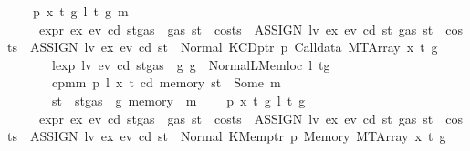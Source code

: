 \begin{isabellebody}
\ \ {\isacharbar}{\kern0pt}\ {\isacharparenleft}{\kern0pt}{}{\isacharparenright}{\kern0pt}\ p\ x\ t\ g\ l\ t{\isacharprime}{\kern0pt}\ g{\isacharprime}{\kern0pt}\ m\isanewline
\ \ \ \ \ {\isachardoublequoteopen}expr\ ex\ ev\ cd\ {\isacharparenleft}{\kern0pt}st{\isasymlparr}gas\ {\isacharcolon}{\kern0pt}{\isacharequal}{\kern0pt}\ gas\ st\ {\isacharminus}{\kern0pt}\ costs\ \ {\isacharparenleft}{\kern0pt}ASSIGN\ lv\ ex{\isacharparenright}{\kern0pt}\ ev\ cd\ st{\isasymrparr}{\isacharparenright}{\kern0pt}\ {\isacharparenleft}{\kern0pt}gas\ st\ {\isacharminus}{\kern0pt}\ costs\ \ {\isacharparenleft}{\kern0pt}ASSIGN\ lv\ ex{\isacharparenright}{\kern0pt}\ ev\ cd\ st{\isacharparenright}{\kern0pt}\ {\isacharequal}{\kern0pt}\ Normal\ {\isacharparenleft}{\kern0pt}{\isacharparenleft}{\kern0pt}KCDptr\ p{\isacharcomma}{\kern0pt}\ Calldata\ {\isacharparenleft}{\kern0pt}MTArray\ x\ t{\isacharparenright}{\kern0pt}{\isacharparenright}{\kern0pt}{\isacharcomma}{\kern0pt}\ g{\isacharparenright}{\kern0pt}{\isachardoublequoteclose}\isanewline
\ \ \ \ \ \ \ {\isachardoublequoteopen}lexp\ lv\ ev\ cd\ {\isacharparenleft}{\kern0pt}st{\isasymlparr}gas\ {\isacharcolon}{\kern0pt}{\isacharequal}{\kern0pt}\ g{\isasymrparr}{\isacharparenright}{\kern0pt}\ g\ {\isacharequal}{\kern0pt}\ Normal{\isacharparenleft}{\kern0pt}{\isacharparenleft}{\kern0pt}LMemloc\ l{\isacharcomma}{\kern0pt}\ t{\isacharprime}{\kern0pt}{\isacharparenright}{\kern0pt}{\isacharcomma}{\kern0pt}g{\isacharprime}{\kern0pt}{\isacharparenright}{\kern0pt}{\isachardoublequoteclose}\isanewline
\ \ \ \ \ \ \ {\isachardoublequoteopen}cpm{}m\ p\ l\ x\ t\ cd\ {\isacharparenleft}{\kern0pt}memory\ st{\isacharparenright}{\kern0pt}\ {\isacharequal}{\kern0pt}\ Some\ m{\isachardoublequoteclose}\isanewline
\ \ \ \ \ \ \ {\isachardoublequoteopen}st{\isacharprime}{\kern0pt}\ {\isacharequal}{\kern0pt}\ st{\isasymlparr}gas\ {\isacharcolon}{\kern0pt}{\isacharequal}{\kern0pt}\ g{\isacharprime}{\kern0pt}{\isacharcomma}{\kern0pt}\ memory\ {\isacharcolon}{\kern0pt}{\isacharequal}{\kern0pt}\ m{\isasymrparr}{\isachardoublequoteclose}\isanewline
\ \ {\isacharbar}{\kern0pt}\ {\isacharparenleft}{\kern0pt}{}{\isacharparenright}{\kern0pt}\ p\ x\ t\ g\ l\ t{\isacharprime}{\kern0pt}\ g{\isacharprime}{\kern0pt}\isanewline
\ \ \ \ \ {\isachardoublequoteopen}expr\ ex\ ev\ cd\ {\isacharparenleft}{\kern0pt}st{\isasymlparr}gas\ {\isacharcolon}{\kern0pt}{\isacharequal}{\kern0pt}\ gas\ st\ {\isacharminus}{\kern0pt}\ costs\ \ {\isacharparenleft}{\kern0pt}ASSIGN\ lv\ ex{\isacharparenright}{\kern0pt}\ ev\ cd\ st{\isasymrparr}{\isacharparenright}{\kern0pt}\ {\isacharparenleft}{\kern0pt}gas\ st\ {\isacharminus}{\kern0pt}\ costs\ \ {\isacharparenleft}{\kern0pt}ASSIGN\ lv\ ex{\isacharparenright}{\kern0pt}\ ev\ cd\ st{\isacharparenright}{\kern0pt}\ {\isacharequal}{\kern0pt}\ Normal\ {\isacharparenleft}{\kern0pt}{\isacharparenleft}{\kern0pt}KMemptr\ p{\isacharcomma}{\kern0pt}\ Memory\ {\isacharparenleft}{\kern0pt}MTArray\ x\ t{\isacharparenright}{\kern0pt}{\isacharparenright}{\kern0pt}{\isacharcomma}{\kern0pt}\ g{\isacharparenright}{\kern0pt}{\isachardoublequoteclose}\isanewline

\end{isabellebody}
